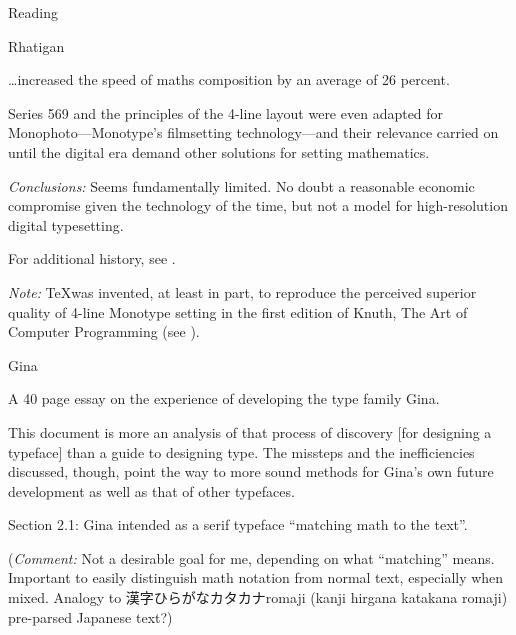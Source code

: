 \documentclass[11pt]{PalisadesLakesBook}
\begin{document}
\begin{plSection}{Reading}
\begin{plSection}{Rhatigan}
\begin{plSection}{}
\begin{plQuote}{}
{}
\ldots increased the speed of maths composition 
by an average of 26 percent.
\end{plQuote}

\begin{plQuote}{}
{}
Series 569 and the principles of the 4-line layout 
were even adapted for Monophoto---Monotype's 
filmsetting technology---and their relevance carried on 
until the digital era demand other solutions 
for setting mathematics.
\end{plQuote}

\emph{Conclusions:}
Seems fundamentally limited. 
No doubt a reasonable economic compromise given the technology of
the time, but not a model for high-resolution digital typesetting.

For additional history, see
.

\emph{Note:} \TeX was invented, at least in part, 
to reproduce the perceived superior quality 
of 4-line Monotype setting
in the first edition of Knuth, The Art of Computer Programming
(see ).

\end{plSection}%
\begin{plSection}{Gina}

\begin{plSection}{}

A 40 page essay on the experience of developing the type family
Gina.

\begin{plQuote}{}{}
This document is more an analysis of that process of discovery
[for designing a typeface]
than a guide to designing type.
The missteps and the inefficiencies discussed, though, 
point the way to more sound methods for 
Gina's own future development as well as that of other typefaces.
\end{plQuote}

Section 2.1: Gina intended as a serif typeface 
``matching math to the text''.

(\emph{Comment:} Not a desirable goal for me, depending
on what ``matching'' means.
Important to easily distinguish math notation from normal text,
especially when mixed. 
Analogy to 漢字\allowbreak ひらがな\allowbreak カタカナ\allowbreak romaji
(kanji hirgana katakana romaji) pre-parsed Japanese text?)



\end{plSection}
\end{plSection}
\end{plSection}
\end{plSection}
\end{document}
